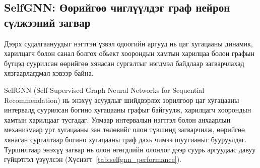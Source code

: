 \documentclass[conference]{IEEEtran}
\begin{document}
\begin{table}[h]
\caption{Графын нэмэлт шинжүүдийн гүйцэтгэлд үзүүлэх нөлөөллийн харьцуулалт}
\label{tab:feature_comparison}
\centering

\renewcommand{\arraystretch}{1.3}
\setlength{\tabcolsep}{6pt}

\end{table}
 
\subsection{SelfGNN: Өөрийгөө чиглүүлдэг граф нейрон сүлжээний загвар}

Дээрх судалгаануудыг нэгтгэн үзвэл одоогийн аргууд нь цаг хугацааны динамик, харилцагч болон санал болгох обьект хоорондын хамтын харилцаа болон графын бүтцэд суурилсан өөрийгөө хянасан сургалтыг нэгдмэл байдлаар загварчлахад хязгаарлагдмал хэвээр байна. 

SelfGNN (Self-Supervised Graph Neural Networks for Sequential Recommendation) \cite{selfgnn2024} нь энэхүү асуудлыг шийдвэрлэх зорилгоор цаг хугацааны интервалд суурилсан богино хугацааны графыг байгуулж, харилцагч хоорондын хамтын харилцааг тусгадаг. Улмаар интервалын нэгтгэл болон анхаарлын механизмаар урт хугацааны зан төлөвийг олон түвшинд загварчилж, өөрийгөө хянасан сургалтаар богино хугацааны граф дахь чимээ шуугианыг бууруулдаг. Туршилтаар энэхүү загвар нь олон өгөгдлийн олонлог дээр суурь аргуудаас давуу гүйцэтгэл үзүүлсэн (Хүснэгт~\ref{tab:selfgnn_performance}). 
\end{document}
